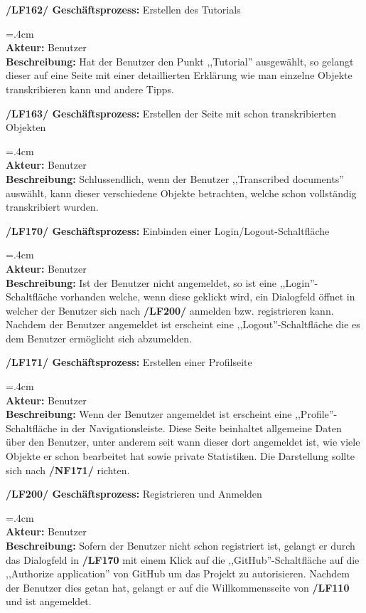 \documentclass{article}
\newenvironment{funcD}{\vspace{-.6cm}\\\par\begingroup\leftskip=.4cm\noindent\\}{\\\par\endgroup\noindent}
\begin{document}
\textbf{/LF162/ Geschäftsprozess:} Erstellen des Tutorials
\begin{funcD}
    \textbf{Akteur:} Benutzer\vspace{.1cm}\\
    \textbf{Beschreibung:} Hat der Benutzer den Punkt ,,Tutorial'' ausgewählt, so gelangt dieser auf eine Seite mit einer detaillierten Erklärung wie man einzelne Objekte transkribieren kann und andere Tipps. 
\end{funcD}
\textbf{/LF163/ Geschäftsprozess:} Erstellen der Seite mit schon transkribierten Objekten
\begin{funcD}
    \textbf{Akteur:} Benutzer\vspace{.1cm}\\
    \textbf{Beschreibung:} Schlussendlich, wenn der Benutzer ,,Transcribed documents'' auswählt, kann dieser verschiedene Objekte betrachten, welche schon vollständig transkribiert wurden. 
\end{funcD}
\textbf{/LF170/ Geschäftsprozess:} Einbinden einer Login/Logout-Schaltfläche
\begin{funcD}
    \textbf{Akteur:} Benutzer\vspace{.1cm}\\
    \textbf{Beschreibung:} Ist der Benutzer nicht angemeldet, so ist eine ,,Login''-Schaltfläche vorhanden welche, wenn diese geklickt wird, ein Dialogfeld öffnet in welcher der Benutzer sich nach \textbf{/LF200/} anmelden bzw. registrieren kann. Nachdem der Benutzer angemeldet ist erscheint eine ,,Logout''-Schaltfläche die es dem Benutzer ermöglicht sich abzumelden. 
\end{funcD}
\textbf{/LF171/ Geschäftsprozess:} Erstellen einer Profilseite
\begin{funcD}
    \textbf{Akteur:} Benutzer\vspace{.1cm}\\
    \textbf{Beschreibung:} Wenn der Benutzer angemeldet ist erscheint eine ,,Profile''-Schaltfläche in der Navigationsleiste. Diese Seite beinhaltet allgemeine Daten über den Benutzer, unter anderem seit wann dieser dort angemeldet ist, wie viele Objekte er schon bearbeitet hat sowie private Statistiken. Die Darstellung sollte sich nach \textbf{/NF171/} richten.
\end{funcD}
\textbf{/LF200/ Geschäftsprozess:} Registrieren und Anmelden
\begin{funcD}
    \textbf{Akteur:} Benutzer\vspace{.1cm}\\
    \textbf{Beschreibung:} Sofern der Benutzer nicht schon registriert ist, gelangt er durch das Dialogfeld in \textbf{/LF170} mit einem Klick auf die ,,GitHub''-Schaltfläche auf die ,,Authorize application'' von GitHub um das Projekt zu autorisieren. Nachdem der Benutzer dies getan hat, gelangt er auf die Willkommensseite von \textbf{/LF110} und ist angemeldet. 
\end{funcD}
\end{document}
